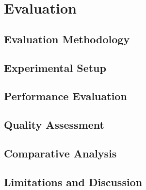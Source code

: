 \chapter{Evaluation}
\label{ch:evaluation}

\section{Evaluation Methodology}
\label{sec:evaluation-methodology}


\section{Experimental Setup}
\label{sec:experimental-setup}


\section{Performance Evaluation}
\label{sec:performance-evaluation}


\section{Quality Assessment}
\label{sec:quality-assessment}


\section{Comparative Analysis}
\label{sec:comparative-analysis}


\section{Limitations and Discussion}
\label{sec:limitations}

